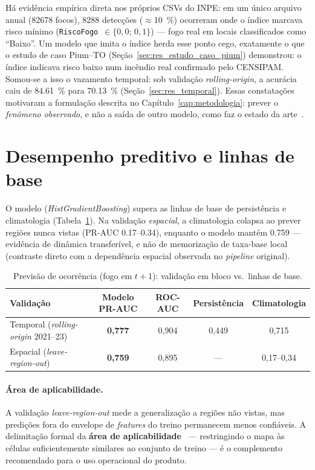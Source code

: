 Há evidência empírica direta nos próprios CSVs do INPE: em um único arquivo anual
(\num{82678} focos), \num{8288} detecções (\(\approx\)\SI{10}{\percent}) ocorreram onde o
índice marcava risco mínimo (\texttt{RiscoFogo}~\(\in\{0{,}0;\,0{,}1\}\)) --- fogo real em
locais classificados como ``Baixo''. Um modelo que imita o índice herda esse ponto cego,
exatamente o que o estudo de caso Pium--TO (Seção~\ref{sec:res_estudo_caso_pium}) demonstrou: o índice indicava risco baixo num incêndio real confirmado pelo CENSIPAM. Somou-se a isso o vazamento temporal: sob validação \emph{rolling-origin}, a acurácia caiu de \SI{84,61}{\percent} para \SI{70,13}{\percent} (Seção~\ref{sec:res_temporal}). Essas constatações motivaram a formulação descrita no Capítulo~\ref{cap:metodologia}: prever o \emph{fenômeno observado}, e não a saída de outro modelo, como faz o estado da arte~\cite{huot2022nextday,karasante2025firecastnet,deandrade2024lstmgru}.

\section{Desempenho preditivo e linhas de base}
\label{sec:oco_desempenho}

O modelo (\emph{Hist\-Gradient\-Boosting}) supera as linhas de base de persistência e
climatologia (Tabela~\ref{tab:oco_validacao}). Na validação \emph{espacial}, a climatologia
colapsa ao prever regiões nunca vistas (PR-AUC \numrange{0,17}{0,34}), enquanto o modelo
mantém \num{0,759} --- evidência de dinâmica transferível, e não de memorização de taxa-base
local (contraste direto com a dependência espacial observada no \emph{pipeline} original).

\begin{table}[h]
\centering
\caption{Previsão de ocorrência (fogo em \(t+1\)): validação em bloco vs.\ linhas de base.}
\label{tab:oco_validacao}
\small
\begin{tabular}{lcccc}
\toprule
\textbf{Validação} & \textbf{Modelo PR-AUC} & \textbf{ROC-AUC} & \textbf{Persistência} & \textbf{Climatologia} \\
\midrule
Temporal (\emph{rolling-origin} 2021--23) & \textbf{0,777} & 0,904 & 0,449 & 0,715 \\
Espacial (\emph{leave-region-out}) & \textbf{0,759} & 0,895 & --- & 0,17--0,34 \\
\bottomrule
\end{tabular}
\end{table}

\paragraph{Área de aplicabilidade.} A validação \emph{leave-region-out} mede a generalização a
regiões não vistas, mas predições fora do envelope de \emph{features} do treino permanecem
menos confiáveis. A delimitação formal da \textbf{área de aplicabilidade}~\cite{meyer2021aoa}
--- restringindo o mapa às células suficientemente similares ao conjunto de treino --- é o
complemento recomendado para o uso operacional do produto.

